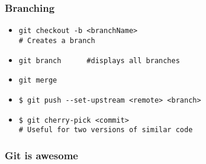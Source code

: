 \documentclass{beamer}
\begin{document}
\begin{frame}[fragile]
\frametitle{Branching}
\begin{itemize}
\item<1,2> \verb=git checkout -b <branchName>=\\
\verb=# Creates a branch=
\item<1,2> \verb=git branch      #displays all branches=
\item<1,2> \verb=git merge=
\item<2> \verb=$ git push --set-upstream <remote> <branch>=\pause
\item<3> \verb=$ git cherry-pick <commit>=\\
\verb=# Useful for two versions of similar code=
\end{itemize}

\end{frame}
\begin{frame}[fragile]
\frametitle{Git is awesome}


\end{frame}

\end{document}
